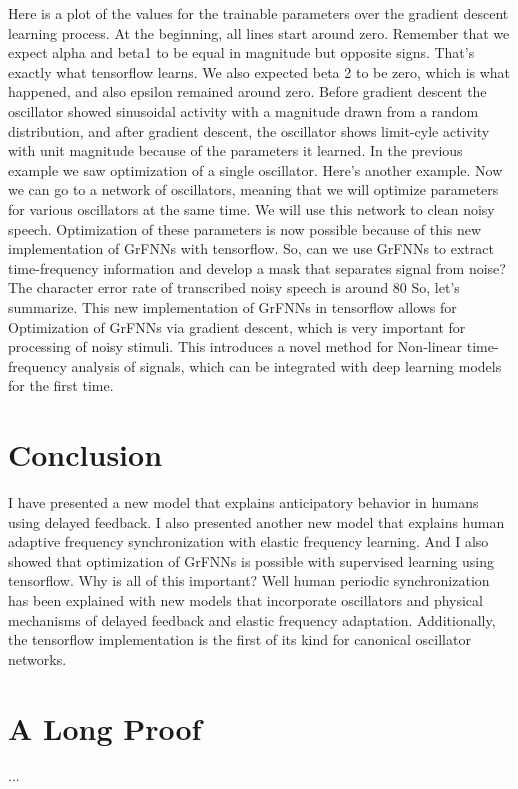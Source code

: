 \documentclass{report}
\begin{document}
Here is a plot of the values for the trainable parameters over the gradient descent learning process. At the beginning, all lines start around zero. Remember that we expect alpha and beta1 to be equal in magnitude but opposite signs. That’s exactly what tensorflow learns. We also expected beta 2 to be zero, which is what happened, and also epsilon remained around zero. Before gradient descent the oscillator showed sinusoidal activity with a magnitude drawn from a random distribution, and after gradient descent, the oscillator shows limit-cyle activity with unit magnitude because of the parameters it learned. 
In the previous example we saw optimization of a single oscillator. Here’s another example. Now we can go to a network of oscillators, meaning that we will optimize parameters for various oscillators at the same time. We will use this network to clean noisy speech. Optimization of these parameters is now possible because of this new implementation of GrFNNs with tensorflow. So, can we use GrFNNs to extract time-frequency information and develop a mask that separates signal from noise? The character error rate of transcribed noisy speech is around 80%
So, let’s summarize. This new implementation of GrFNNs in tensorflow allows for Optimization of GrFNNs via gradient descent, which is very important for processing of noisy stimuli.  This introduces a novel method for Non-linear time-frequency analysis of signals, which can be integrated with deep learning models for the first time.
\chapter{Conclusion}
I have presented a new model that explains anticipatory behavior in humans using delayed feedback. I also presented another new model that explains human adaptive frequency synchronization with elastic frequency learning. And I also showed that optimization of GrFNNs is possible with supervised learning using tensorflow. Why is all of this important? Well human periodic synchronization has been explained with new models that incorporate oscillators and physical mechanisms of delayed feedback and elastic frequency adaptation. Additionally, the tensorflow implementation is the first of its kind for canonical oscillator networks.

\appendix
\chapter{A Long Proof}
     ...


\end{document}
